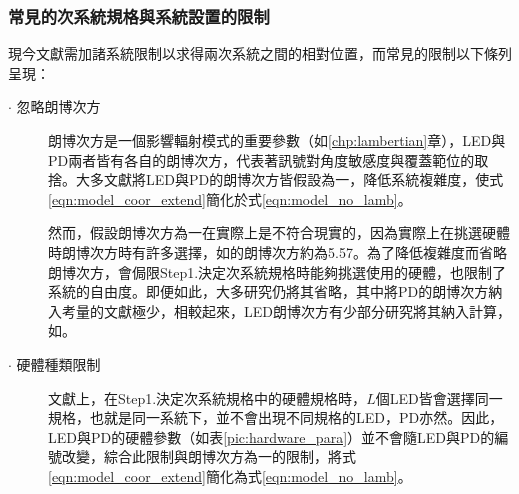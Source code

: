     \subsubsection{常見的次系統規格與系統設置的限制}
    \label{chp:LEDPD_restrict}

    現今文獻需加諸系統限制以求得兩次系統之間的相對位置，而常見的限制以下條列呈現：

    

    \begin{description}
        \item[$\cdot$ 忽略朗博次方] \hfill
        
        \qquad
        朗博次方是一個影響輻射模式的重要參數（如\ref{chp:lambertian}章），LED與PD兩者皆有各自的朗博次方，代表著訊號對角度敏感度與覆蓋範位的取捨。大多文獻將LED與PD的朗博次方皆假設為一，降低系統複雜度，使式\ref{eqn:model_coor_extend}簡化於式\ref{eqn:model_no_lamb}。

        \qquad
        然而，假設朗博次方為一在實際上是不符合現實的，因為實際上在挑選硬體時朗博次方時有許多選擇，如\cite{datasheet:led_vsma}的朗博次方約為5.57。為了降低複雜度而省略朗博次方，會侷限Step1.決定次系統規格時能夠挑選使用的硬體，也限制了系統的自由度\cite{survey_light2018}。即便如此，大多研究仍將其省略，其中將PD的朗博次方納入考量的文獻極少\cite{survey_light2018}，相較起來，LED朗博次方有少部分研究將其納入計算，如\cite{case:cart2d}\cite{case:cart3d}。
        
        

        \item[$\cdot$ 硬體種類限制]\hfill
        
        \qquad
        文獻上，在Step1.決定次系統規格中的硬體規格時，$L$個LED皆會選擇同一規格，也就是同一系統下，並不會出現不同規格的LED，PD亦然。因此，LED與PD的硬體參數（如表\ref{pic:hardware_para}）並不會隨LED與PD的編號改變，綜合此限制與朗博次方為一的限制，將式\ref{eqn:model_coor_extend}簡化為式\ref{eqn:model_no_lamb}。


\end{description}
